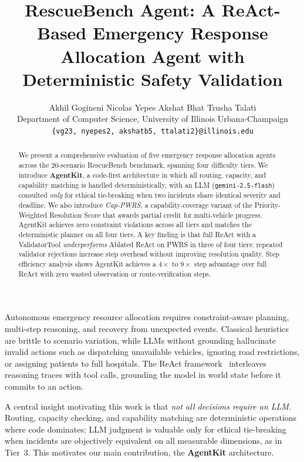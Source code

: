 \documentclass{article}
\title{RescueBench Agent: A ReAct-Based Emergency Response
Allocation Agent with Deterministic Safety Validation}
\author{
  Akhil Gogineni \quad Nicolas Yepes \quad Akshat Bhat \quad Trusha Talati \\
  Department of Computer Science, University of Illinois Urbana-Champaign \\
  \texttt{\{vg23, nyepes2, akshatb5, ttalati2\}@illinois.edu}
}
\makeatletter
\def\section{\@startsection{section}{1}{\z@}{-1.6ex plus -0.4ex minus -.2ex}{1.2ex plus 0.2ex minus 0.1ex}{\large\sc\raggedright}}
\makeatother
\begin{document}
\maketitle

\begin{abstract}
We present a comprehensive evaluation of five emergency response allocation
agents across the 20-scenario RescueBench benchmark, spanning four difficulty
tiers. We introduce \textbf{AgentKit}, a code-first architecture in which all
routing, capacity, and capability matching is handled deterministically, with
an LLM (\texttt{gemini-2.5-flash}) consulted \emph{only} for ethical
tie-breaking when two incidents share identical severity and deadline. We
also introduce \emph{Cap-PWRS}, a capability-coverage variant of the
Priority-Weighted Resolution Score that awards partial credit for
multi-vehicle progress. AgentKit achieves zero constraint violations across
all tiers and matches the deterministic planner on all four tiers. A key
finding is that full ReAct with a ValidatorTool \emph{underperforms} Ablated
ReAct on PWRS in three of four tiers: repeated validator rejections increase
step overhead without improving resolution quality. Step efficiency analysis
shows AgentKit achieves a $4\times$ to $9\times$ step advantage over full
ReAct with zero wasted observation or route-verification steps.
\end{abstract}

\section{Introduction}
\label{sec:intro}

Autonomous emergency resource allocation requires constraint-aware planning,
multi-step reasoning, and recovery from unexpected events. Classical heuristics
are brittle to scenario variation, while LLMs without grounding hallucinate
invalid actions such as dispatching unavailable vehicles, ignoring road
restrictions, or assigning patients to full hospitals. The ReAct
framework~\citep{yao2023react} interleaves reasoning traces with tool calls,
grounding the model in world state before it commits to an action.

A central insight motivating this work is that \emph{not all decisions require
an LLM}. Routing, capacity checking, and capability matching are deterministic
operations where code dominates; LLM judgment is valuable only for ethical
tie-breaking when incidents are objectively equivalent on all measurable
dimensions, as in Tier~3. This motivates our main contribution, the
\textbf{AgentKit} architecture.
\end{document}
